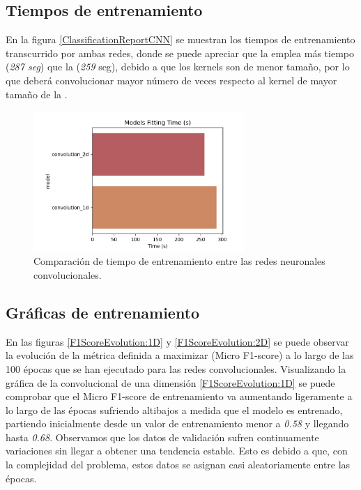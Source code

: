   \subsection{Tiempos de entrenamiento}


    En la figura \eqref{ClassificationReportCNN} se muestran los tiempos de entrenamiento transcurrido por ambas redes, donde se puede apreciar que la  emplea más tiempo (\textit{287 seg}) que la  (\textit{259} seg), debido a que los kernels son de menor tamaño, por lo que deberá convolucionar mayor número de veces respecto al kernel de mayor tamaño de la .

    \begin{figure}[h]
      \centering
      \includegraphics[width=8cm]{archivos/5.Resultados/only_cnns_times}
      \caption{Comparación de tiempo de entrenamiento entre las redes neuronales convolucionales.}
      \label{TiemposEntrenamientoCNNImage}
    \end{figure}



  \subsection{Gráficas de entrenamiento}


    En las figuras \eqref{F1ScoreEvolution:1D} y \eqref{F1ScoreEvolution:2D} se puede observar la evolución de la métrica definida a maximizar (Micro F1-score) a lo largo de las 100 épocas que se han ejecutado para las redes convolucionales. Visualizando la gráfica de la convolucional de una dimensión \eqref{F1ScoreEvolution:1D} se puede comprobar que el Micro F1-score de entrenamiento va aumentando ligeramente a lo largo de las épocas sufriendo altibajos a medida que el modelo es entrenado, partiendo inicialmente desde un valor de entrenamiento menor a \textit{0.58} y llegando hasta \textit{0.68}. Observamos que los datos de validación sufren continuamente variaciones sin llegar a obtener una tendencia estable. Esto es debido a que, con la complejidad del problema, estos datos se asignan casi aleatoriamente entre las épocas.\\


